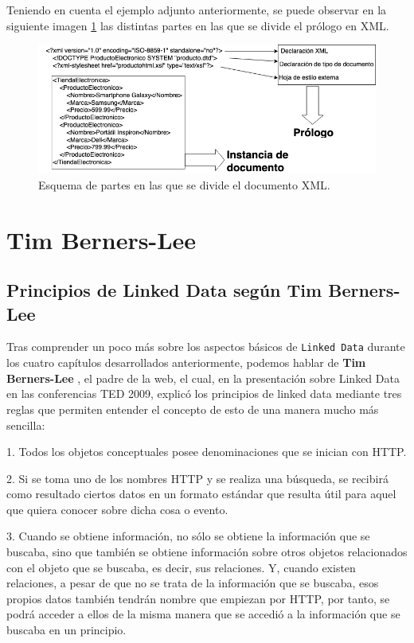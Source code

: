 \documentclass[11pt]{report}
\begin{document}
Teniendo en cuenta el ejemplo adjunto anteriormente, se puede observar en la siguiente imagen \ref{fig:Example-XML} las distintas partes en las que se divide el prólogo en XML.

\begin{figure}[H]
	\centering
	\includegraphics[scale=0.7]{../img/XML-Example-1.png}
	\caption{Esquema de partes en las que se divide el documento XML.}
	\label{fig:Example-XML}
\end{figure}

\chapter{Tim Berners-Lee}

\section{Principios de Linked Data según Tim Berners-Lee}

Tras comprender un poco más sobre los aspectos básicos de \texttt{Linked Data} durante los cuatro capítulos desarrollados anteriormente, podemos hablar de \textbf{Tim Berners-Lee } \cite{11}, el padre de la web,  el cual, en la presentación sobre Linked Data en las conferencias TED 2009, explicó los principios de linked data mediante tres reglas que permiten entender el concepto de esto de una manera mucho más sencilla:

1. Todos los objetos conceptuales posee denominaciones que se inician con HTTP.

2. Si se toma uno de los nombres HTTP y se realiza una búsqueda, se recibirá como resultado ciertos datos en un formato estándar que resulta útil para aquel que quiera conocer sobre dicha cosa o evento.

3. Cuando se obtiene información, no sólo se obtiene la información que se buscaba, sino que también se obtiene información sobre otros objetos relacionados con el objeto que se buscaba, es decir, sus relaciones. Y, cuando existen relaciones, a pesar de que no se trata de la información que se buscaba, esos propios datos también tendrán nombre que empiezan por HTTP, por tanto, se podrá acceder a ellos de la misma manera que se accedió a la información que se buscaba en un principio.
\end{document}
